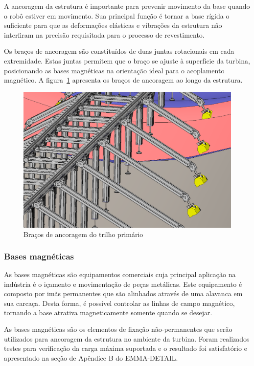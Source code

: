A ancoragem da estrutura é importante para prevenir movimento da base quando o
robô estiver em movimento. Sua principal função é tornar a base rígida o
suficiente para que as deformações elásticas e vibrações da estrutura não
interfiram na precisão requisitada para o processo de revestimento.

Os braços de ancoragem são constituídos de duas juntas rotacionais em cada
extremidade. Estas juntas permitem que o braço se ajuste à superfície da
turbina, posicionando as bases magnéticas na orientação ideal para o acoplamento
magnético. A figura~\ref{fig::ancoragem} apresenta os braços de ancoragem ao
longo da estrutura.

\begin{figure}[h!]
	\centering
	\includegraphics[width=0.9\columnwidth]{method/figs/construcao/ancoragem}
	\caption{Braços de ancoragem do trilho primário}
    \label{fig::ancoragem}
\end{figure}

\subsubsection{Bases magnéticas}

As bases magnéticas são equipamentos comerciais cuja principal aplicação na
indústria é o içamento e movimentação de peças metálicas. Este equipamento é
composto por imãs permanentes que são alinhados através de uma alavanca em sua
carcaça. Desta forma, é possível controlar as linhas de campo magnético,
tornando a base atrativa magneticamente somente quando se desejar.

As bases magnéticas são os elementos de fixação não-permanentes que serão
utilizados para ancoragem da estrutura no ambiente da turbina. Foram realizados
testes para verificação da carga máxima suportada e o resultado foi
satisfatório e apresentado na seção de Apêndice B do EMMA-DETAIL.



